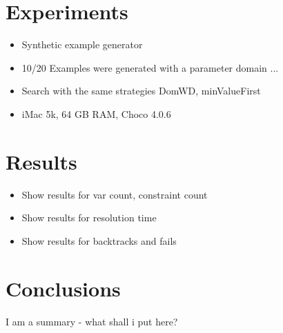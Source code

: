 \documentclass[english,biblatex]{lni}
\begin{document}
\section{Experiments}

\begin{itemize}
\item Synthetic example generator 
\item 10/20 Examples were generated with a parameter domain ...
\item Search with the same strategies DomWD, minValueFirst
\item iMac 5k, 64 GB RAM, Choco 4.0.6
\end{itemize}

\section{Results}

\begin{itemize}
\item Show results for var count, constraint count
\item Show results for resolution time
\item Show results for backtracks and fails
\end{itemize}

\section{Conclusions}

I am a summary - what shall i put here?

\printbibliography[heading=bibintoc]
\end{document}
